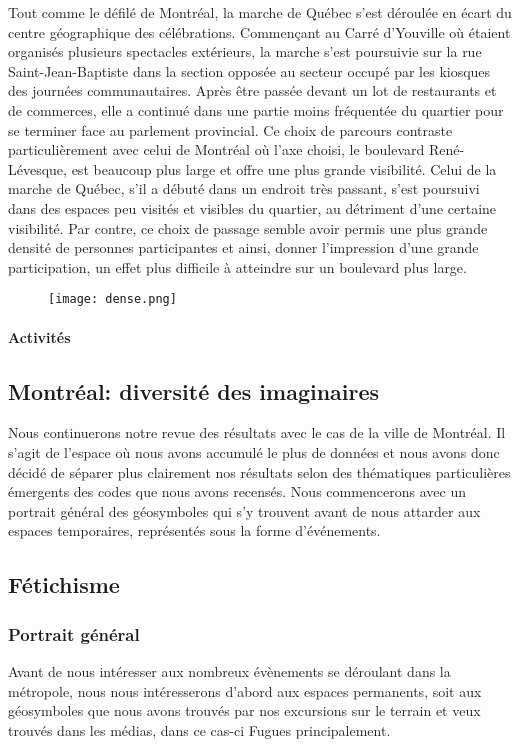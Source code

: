 Tout comme le défilé de Montréal, la marche de Québec s'est déroulée en écart du centre géographique des célébrations.
Commençant au Carré d'Youville où étaient organisés plusieurs spectacles extérieurs, la marche s'est poursuivie sur la rue Saint-Jean-Baptiste dans la section opposée au secteur occupé par les kiosques des journées communautaires.
Après être passée devant un lot de restaurants et de commerces, elle a continué dans une partie moins fréquentée du quartier pour se terminer face au parlement provincial.
Ce choix de parcours contraste particulièrement avec celui de Montréal où l'axe choisi, le boulevard René-Lévesque, est beaucoup plus large et offre une plus grande visibilité.
Celui de la marche de Québec, s'il a débuté dans un endroit très passant, s'est poursuivi dans des espaces peu visités et visibles du quartier, au détriment d'une certaine visibilité.
Par contre, ce choix de passage semble avoir permis une plus grande densité de personnes participantes et ainsi, donner l'impression d'une grande participation, un effet plus difficile à atteindre sur un boulevard plus large.

\begin{figure}[ht]
\centering
\texttt{[image: dense.png]}\caption{\label{fig:label} }
\end{figure}

\paragraph{Activités}
\label{subsec:activitesfiertemontreal}


\subsection{Montréal: diversité des imaginaires}
\label{sec:montr_al_diversit_des_imaginaires}
Nous continuerons notre revue des résultats avec le cas de la ville de Montréal.
Il s'agit de l'espace où nous avons accumulé le plus de données et nous avons donc décidé de séparer plus clairement nos résultats selon des thématiques particulières émergents des codes que nous avons recensés.
Nous commencerons avec un portrait général des géosymboles qui s'y trouvent avant de nous attarder aux espaces temporaires, représentés sous la forme d'événements.

\subsection{Fétichisme}
\subsubsection{Portrait général}
\label{subsec:portraitgeneralmtl}
Avant de nous intéresser aux nombreux évènements se déroulant dans la métropole, nous nous intéresserons d'abord aux espaces permanents, soit aux géosymboles que nous avons trouvés par nos excursions sur le terrain et veux trouvés dans les médias, dans ce cas-ci Fugues principalement.

